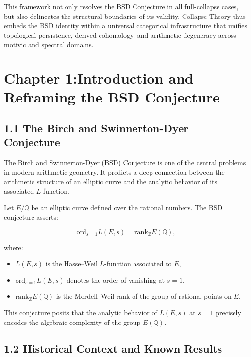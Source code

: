\documentclass[11pt]{article}
\newcommand{\QQ}{\mathbb{Q}}
\newcommand{\ZZ}{\mathbb{Z}}
\begin{document}
This framework not only resolves the BSD Conjecture in all full-collapse cases, but also delineates the structural boundaries of its validity. Collapse Theory thus embeds the BSD identity within a universal categorical infrastructure that unifies topological persistence, derived cohomology, and arithmetic degeneracy across motivic and spectral domains.





\section{Chapter 1:Introduction and Reframing the BSD Conjecture}

\subsection{1.1 The Birch and Swinnerton-Dyer Conjecture}

The Birch and Swinnerton-Dyer (BSD) Conjecture is one of the central problems in modern arithmetic geometry.  
It predicts a deep connection between the arithmetic structure of an elliptic curve and the analytic behavior of its associated $L$-function.

Let $E/\QQ$ be an elliptic curve defined over the rational numbers.  
The BSD conjecture asserts:

\begin{equation}
\label{eq:bsd}
\mathrm{ord}_{s=1} L(E,s) = \mathrm{rank}_{\ZZ} E(\QQ),
\end{equation}

where:
\begin{itemize}
  \item $L(E,s)$ is the Hasse–Weil $L$-function associated to $E$,
  \item $\mathrm{ord}_{s=1} L(E,s)$ denotes the order of vanishing at $s=1$,
  \item $\mathrm{rank}_{\ZZ} E(\QQ)$ is the Mordell–Weil rank of the group of rational points on $E$.
\end{itemize}

This conjecture posits that the analytic behavior of $L(E,s)$ at $s=1$ precisely encodes the algebraic complexity of the group $E(\QQ)$.

\subsection{1.2 Historical Context and Known Results}
\end{document}
